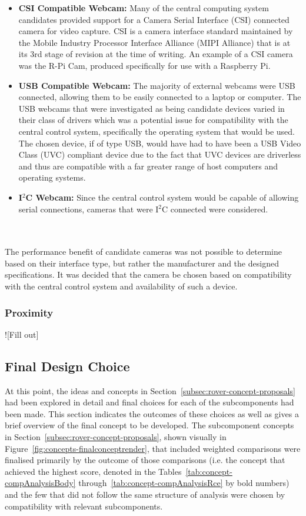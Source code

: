       \begin{itemize}
        \item \textbf{CSI Compatible Webcam:} Many of the central computing system candidates provided support for a Camera Serial Interface (CSI) connected camera for video capture. CSI is a camera interface standard maintained by the Mobile Industry Processor Interface Alliance (MIPI Alliance) that is at its 3rd stage of revision at the time of writing. An example of a CSI camera was the R-Pi Cam, produced specifically for use with a Raspberry Pi.
        \item \textbf{USB Compatible Webcam:} The majority of external webcams were USB connected, allowing them to be easily connected to a laptop or computer. The USB webcams that were investigated as being candidate devices varied in their class of drivers which was a potential issue for compatibility with the central control system, specifically the operating system that would be used. The chosen device, if of type USB, would have had to have been a USB Video Class (UVC) compliant device due to the fact that UVC devices are driverless and thus are compatible with a far greater range of host computers and operating systems.
        \item \textbf{I$^2$C Webcam:} Since the central control system would be capable of allowing serial connections, cameras that were I$^2$C connected were considered.
      \end{itemize}
      
      \\\\
        The performance benefit of candidate cameras was not possible to determine based on their interface type, but rather the manufacturer and the designed specifications. It was decided that the camera be chosen based on compatibility with the central control system and availability of such a device.
      
    \subsubsection{Proximity}
      ![Fill out]
  
  \subsection{Final Design Choice}
    At this point, the ideas and concepts in Section~\ref{subsec:rover-concept-proposals} had been explored in detail and final choices for each of the subcomponents had been made. This section indicates the outcomes of these choices as well as gives a brief overview of the final concept to be developed. The subcomponent concepts in Section~\ref{subsec:rover-concept-proposals}, shown visually in Figure~\ref{fig:concepts-finalconceptrender}, that included weighted comparisons were finalised primarily by the outcome of those comparisons (i.e. the concept that achieved the highest score, denoted in the Tables~\ref{tab:concept-compAnalysisBody} through~\ref{tab:concept-compAnalysisRce} by bold numbers) and the few that did not follow the same structure of analysis were chosen by compatibility with relevant subcomponents.
    
